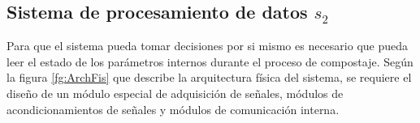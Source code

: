 \newpage

\subsection{Sistema de procesamiento de datos $s_2$}

Para que el sistema pueda tomar decisiones por si mismo  es necesario que pueda leer el estado de los parámetros internos durante el proceso de compostaje. Según la figura \ref{fg:ArchFis} que describe la arquitectura física del sistema, se requiere el diseño de un módulo especial de adquisición de señales, módulos de acondicionamientos de señales y módulos de comunicación interna. 




%